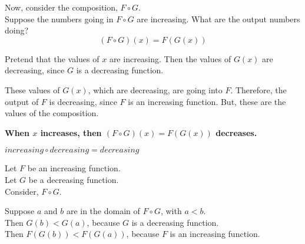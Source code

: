 \documentclass{ximera}
\begin{document}
Now, consider the composition, $F \circ G$. \\


Suppose the numbers going in $F \circ G$ are increasing.  What are the output numbers doing? \\




\[ (F \circ G)(x) = F(G(x)) \]


Pretend that the values of $x$ are increasing. Then the values of $G(x)$ are decreasing, since $G$ is a decreasing function.

These values of $G(x)$, which are decreasing, are going into $F$.  Therefore, the output of $F$ is decreasing, since $F$ is an increasing function.  But, these are the values of the composition.


\begin{center}
\textbf{\textcolor{red!80!black}{When $x$ increases, then $(F \circ G)(x) = F(G(x))$ decreases.}}
\end{center}



\begin{fact}
$increasing \circ decreasing = decreasing$


Let $F$ be an increasing function. \\
Let $G$ be a decreasing function. \\


Consider, $F \circ G$.

Suppose $a$ and $b$ are in the domain of $F \circ G$, with $a < b$. \\

Then $G(b) < G(a)$, because $G$ is a decreasing function. \\

Then $F(G(b)) < F(G(a))$, because $F$ is an increasing function.


\end{fact}
\end{document}
